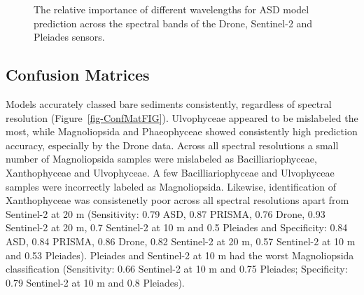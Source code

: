 \documentclass[
  letterpaper,
  11pt,
  english,
  singlespacing,
  headsepline]{MastersDoctoralThesis}
\begin{document}
\begin{spacing}{1.5}
\begin{figure}


\caption{\label{fig-VIPFunction}The relative importance of different
wavelengths for ASD model prediction across the spectral bands of the
Drone, Sentinel-2 and Pleiades sensors.}

\end{figure}%

\subsection{Confusion Matrices}\label{confusion-matrices}

Models accurately classed bare sediments consistently, regardless of
spectral resolution (Figure~\ref{fig-ConfMatFIG}). Ulvophyceae appeared
to be mislabeled the most, while Magnoliopsida and Phaeophyceae showed
consistently high prediction accuracy, especially by the Drone data.
Across all spectral resolutions a small number of Magnoliopsida samples
were mislabeled as Bacilliariophyceae, Xanthophyceae and Ulvophyceae. A
few Bacilliariophyceae and Ulvophyceae samples were incorrectly labeled
as Magnoliopsida. Likewise, identification of Xanthophyceae was
consistenetly poor across all spectral resolutions apart from Sentinel-2
at 20 m (Sensitivity: 0.79 ASD, 0.87 PRISMA, 0.76 Drone, 0.93 Sentinel-2
at 20 m, 0.7 Sentinel-2 at 10 m and 0.5 Pleiades and Specificity: 0.84
ASD, 0.84 PRISMA, 0.86 Drone, 0.82 Sentinel-2 at 20 m, 0.57 Sentinel-2
at 10 m and 0.53 Pleiades). Pleiades and Sentinel-2 at 10 m had the
worst Magnoliopsida classification (Sensitivity: 0.66 Sentinel-2 at 10 m
and 0.75 Pleiades; Specificity: 0.79 Sentinel-2 at 10 m and 0.8
Pleiades).


\end{spacing}
\end{document}
